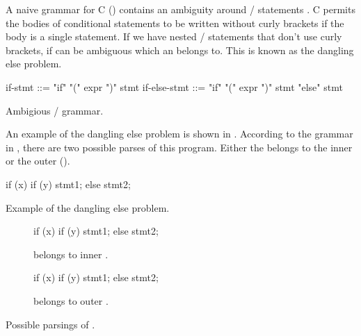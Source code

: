 \documentclass[00-main.tex]{subfiles}
\begin{document}
A naive grammar for C () contains an ambiguity around / statements .
C permits the bodies of conditional statements to be written without curly brackets if the body is a single statement.
If we have nested / statements that don't use curly brackets, if can be ambiguous which  an  belongs to. This is known as the dangling else problem.

\begin{listing}[!ht]
  \begin{GrammarListing}
    if-stmt      ::= "if" "(" expr ")" stmt
    if-else-stmt ::= "if" "(" expr ")" stmt "else" stmt
  \end{GrammarListing}
  \caption{Ambigious / grammar.}
  \label{lst:ambiguous if-else grammar}
\end{listing}

An example of the dangling else problem is shown in .
According to the grammar in , there are two possible parses of this program.
Either the  belongs to the inner or the outer  ().

\begin{listing}[!ht]
  \begin{CListing}
    if (x)
      if (y)
        stmt1;
    else
      stmt2;
  \end{CListing}
  \caption{Example of the dangling else problem.}
  \label{lst:dangling else}
\end{listing}

\begin{listing}[!ht]
  \begin{subfigure}[t]{0.49\textwidth}
    \begin{CListing}
      if (x) {
        if (y) {
          stmt1;
        } else {
          stmt2;
        }
      }
    \end{CListing}
    \caption{ belongs to inner .}
  \end{subfigure}
  \hfill
  \begin{subfigure}[t]{0.49\textwidth}
    \begin{CListing}
      if (x) {
        if (y) {
          stmt1;
        }
      } else {
        stmt2;
      }
    \end{CListing}
    \caption{ belongs to outer .}
  \end{subfigure}
  \caption{Possible parsings of .}
  \label{lst:dangling else possible parsings}
\end{listing}
\end{document}
